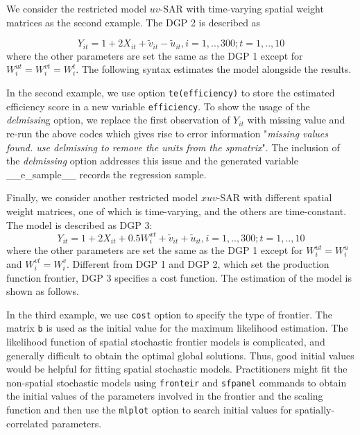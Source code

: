 We consider the restricted model $uv$-SAR with time-varying spatial weight matrices as the second example. The DGP 2 is described as

\begin{equation}\label{dgp2}
	Y_{it} = 1+2X_{it} + \tilde{v}_{it}-\tilde{u}_{it}, i=1,..,300; t=1,..,10
\end{equation}
where the other parameters are set the same as the DGP 1 except for $W_{i}^{ut}=W_{i}^{vt}=W_{i}^t$. The following syntax estimates the model alongside the results.

\begin{stlog}
	
\end{stlog}

In the second example, we use option {\tt te(efficiency)} to store the estimated efficiency score in a new variable {\tt efficiency}.  To show the usage of the \textit{delmissin}g option, we replace the first observation of $Y_{it}$ with missing value and re-run the above codes which gives rise to error information "\textit{missing values found. use delmissing to remove the units from the spmatrix}".  The inclusion of the \textit{delmissing} option addresses this issue and the generated variable \_\_e\_sample\_\_ records the regression sample. 

\begin{stlog}
	
\end{stlog}

\begin{stlog}
	
\end{stlog}

Finally, we consider another restricted model $xuv$-SAR with different spatial weight matrices, one of which is time-varying, and the others are time-constant.  The model is described as DGP 3:
\begin{equation}\label{dgp3}
	Y_{it} = 1+2X_{it}+ 0.5W_{i}^{xt} + \tilde{v}_{it}+\tilde{u}_{it}, i=1,..,300; t=1,..,10
\end{equation}
where the other parameters are set the same as the DGP 1 except for $W_{i}^{ut}=W_{i}^u$ and $W_{i}^{vt}=W_{i}^v$.  Different from DGP 1 and DGP 2, which set the production function frontier, DGP 3 specifies a cost function. The estimation of the model is shown as follows.

\begin{stlog}
	
\end{stlog}

In the third example, we use {\tt cost} option to specify the type of frontier.  The matrix {\tt b} is used as the initial value for the maximum likelihood estimation. The likelihood function of spatial stochastic frontier models is complicated, and generally difficult to obtain the optimal global solutions. Thus, good initial values would be helpful for fitting spatial stochastic models. Practitioners might fit the non-spatial stochastic models using  {\tt fronteir} and {\tt sfpanel} commands to obtain the initial values of the parameters involved in the frontier and the scaling function and then use the {\tt mlplot} option to search initial values for spatially-correlated parameters.
 
